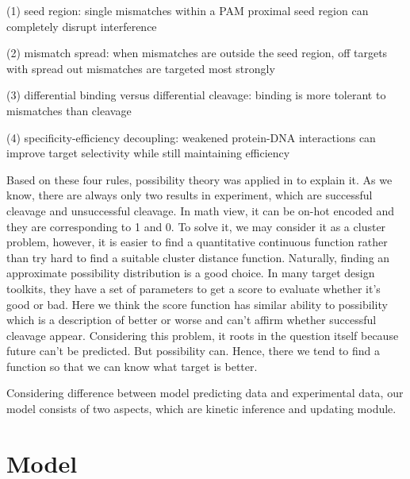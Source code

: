 \documentclass[a4paper,10pt]{article}
\begin{document}
	(1) seed region: single mismatches within a PAM proximal seed region can completely disrupt interference\par
	(2) mismatch spread: when mismatches are outside the seed region, off targets with spread out mismatches are targeted most strongly\par
	(3) differential binding versus differential cleavage: binding is more tolerant to mismatches than cleavage\par 
	(4) specificity-efficiency decoupling: weakened protein-DNA interactions can improve target selectivity while still maintaining efficiency\par
	Based on these four rules, possibility theory was applied in to explain it. As we know, there are always only two results in experiment, which are successful cleavage and unsuccessful cleavage. In math view, it can be on-hot encoded and they are corresponding to 1 and 0. To solve it, we may consider it as a cluster problem, however, it is easier to find a quantitative continuous function rather than try hard to find a suitable cluster distance function. Naturally, finding an approximate possibility distribution is a good choice. In many target design toolkits, they have a set of parameters to get a score to evaluate whether it’s good or bad. Here we think the score function has similar ability to possibility which is a description of better or worse and can’t affirm whether successful cleavage appear. Considering this problem, it roots in the question itself because future can’t be predicted. But possibility can. Hence, there we tend to find a function so that we can know what target is better.\par
	Considering difference between model predicting data and experimental data, our model consists of two aspects, which are kinetic inference and updating module.
	\section{Model}
\end{document}
